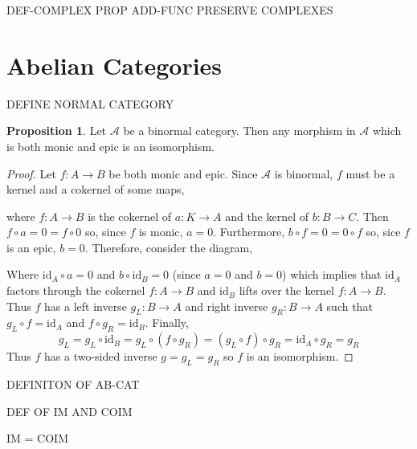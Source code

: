 \documentclass[12pt]{article}
\newcommand{\id}{\mathrm{id}}
\newcommand{\A}{\mathcal{A}}
\theoremstyle{remark}
\theoremstyle{definition}
\newtheorem{proposition}[theorem]{Proposition}
\begin{document}
DEF-COMPLEX
PROP ADD-FUNC PRESERVE COMPLEXES

\section{Abelian Categories}

DEFINE NORMAL CATEGORY

\begin{proposition}
Let $\A$ be a binormal category. Then any morphism in $\A$ which is both monic and epic is an isomorphism. 
\end{proposition}

\begin{proof}
Let $f : A \to B$ be both monic and epic. Since $\A$ is binormal, $f$ must be a kernel and a cokernel of some maps,
\begin{center}
\end{center}
where $f : A \to B$ is the cokernel of $a : K \to A$ and the kernel of $b : B \to C$. Then $f \circ a = 0 = f \circ 0$ so, since $f$ is monic, $a = 0$. Furthermore, $b \circ f = 0 = 0 \circ f$ so, sice $f$ is an epic, $b = 0$. Therefore, consider the diagram,
\begin{center}
\end{center} 
Where $\id_A \circ a = 0$ and $b \circ \id_B = 0$ (since $a = 0$ and $b = 0$) which implies that $\id_A$ factors through the cokernel $f :A \to B$ and $\id_B$ lifts over the kernel $f : A \to B$. Thus $f$ has a left inverse $g_L : B \to A$ and right inverse $g_R : B \to A$ such that $g_L \circ f = \id_A$ and $f \circ g_R = \id_B$. Finally, 
\[ g_L = g_L \circ \id_B = g_L \circ (f \circ g_R) = (g_L \circ f) \circ g_R = \id_A \circ g_R = g_R \]
Thus $f$ has a two-sided inverse $g = g_L = g_R$ so $f$ is an isomorphism.
\end{proof}

DEFINITON OF AB-CAT

DEF OF IM AND COIM

IM = COIM
\end{document}
